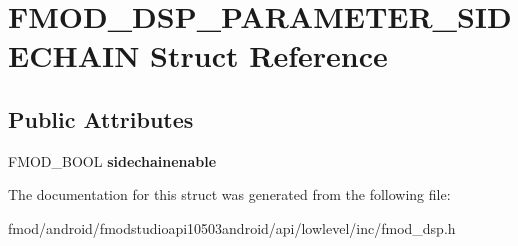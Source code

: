 \hypertarget{struct_f_m_o_d___d_s_p___p_a_r_a_m_e_t_e_r___s_i_d_e_c_h_a_i_n}{\section{F\+M\+O\+D\+\_\+\+D\+S\+P\+\_\+\+P\+A\+R\+A\+M\+E\+T\+E\+R\+\_\+\+S\+I\+D\+E\+C\+H\+A\+I\+N Struct Reference}
\label{struct_f_m_o_d___d_s_p___p_a_r_a_m_e_t_e_r___s_i_d_e_c_h_a_i_n}
}
\subsection*{Public Attributes}
\begin{DoxyCompactItemize}
\item 
\hypertarget{struct_f_m_o_d___d_s_p___p_a_r_a_m_e_t_e_r___s_i_d_e_c_h_a_i_n_a1f89ce2f7a7d9b8a34c8d7844c1211aa}{F\+M\+O\+D\+\_\+\+B\+O\+O\+L {\bfseries sidechainenable}}\label{struct_f_m_o_d___d_s_p___p_a_r_a_m_e_t_e_r___s_i_d_e_c_h_a_i_n_a1f89ce2f7a7d9b8a34c8d7844c1211aa}

\end{DoxyCompactItemize}


The documentation for this struct was generated from the following file\+:\begin{DoxyCompactItemize}
\item 
fmod/android/fmodstudioapi10503android/api/lowlevel/inc/fmod\+\_\+dsp.\+h\end{DoxyCompactItemize}

